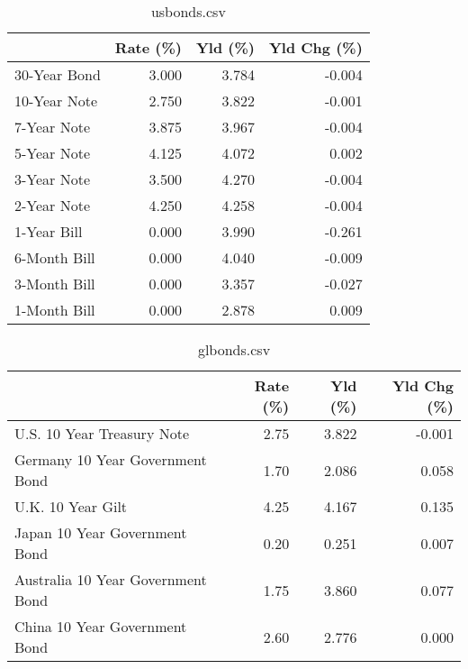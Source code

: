 \documentclass{article}%
\begin{document}
%


\begin{table}[htbp]%
\caption{usbonds.csv}%
\centering%
\begin{adjustbox}{width=1\textwidth}%
\begin{tabular}{lrrr}
\toprule
             &  Rate (\%) &  Yld (\%) &  Yld Chg (\%) \\
\midrule
30-Year Bond &     3.000 &    3.784 &       -0.004 \\
10-Year Note &     2.750 &    3.822 &       -0.001 \\
 7-Year Note &     3.875 &    3.967 &       -0.004 \\
 5-Year Note &     4.125 &    4.072 &        0.002 \\
 3-Year Note &     3.500 &    4.270 &       -0.004 \\
 2-Year Note &     4.250 &    4.258 &       -0.004 \\
 1-Year Bill &     0.000 &    3.990 &       -0.261 \\
6-Month Bill &     0.000 &    4.040 &       -0.009 \\
3-Month Bill &     0.000 &    3.357 &       -0.027 \\
1-Month Bill &     0.000 &    2.878 &        0.009 \\
\bottomrule
\end{tabular}
%
\end{adjustbox}%
\end{table}

%


\begin{table}[htbp]%
\caption{glbonds.csv}%
\centering%
\begin{adjustbox}{width=1\textwidth}%
\begin{tabular}{lrrr}
\toprule
                                  &  Rate (\%) &  Yld (\%) &  Yld Chg (\%) \\
\midrule
       U.S. 10 Year Treasury Note &      2.75 &    3.822 &       -0.001 \\
  Germany 10 Year Government Bond &      1.70 &    2.086 &        0.058 \\
                U.K. 10 Year Gilt &      4.25 &    4.167 &        0.135 \\
    Japan 10 Year Government Bond &      0.20 &    0.251 &        0.007 \\
Australia 10 Year Government Bond &      1.75 &    3.860 &        0.077 \\
    China 10 Year Government Bond &      2.60 &    2.776 &        0.000 \\
\bottomrule
\end{tabular}
%
\end{adjustbox}%
\end{table}
\end{document}
